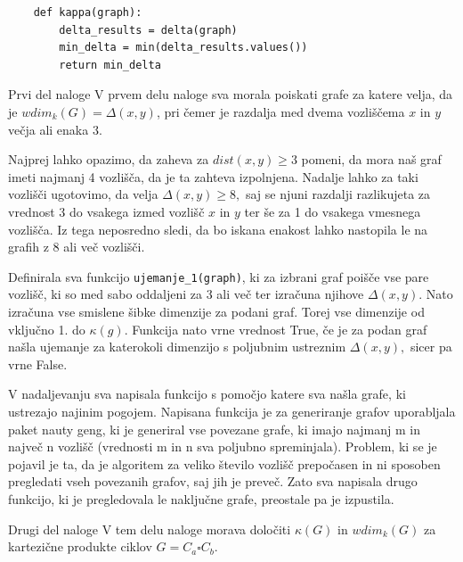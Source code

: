 \documentclass[12pt,a4paper]{amsart}
\makeatletter
\renewcommand\subsection{\@startsection{subsection}{2}%
  \z@{.5\linespacing\@plus.7\linespacing}{.5\linespacing}%
  {\normalfont\scshape}}
\theoremstyle{plain} %
\makeatother
\begin{document}
\begin{lstlisting}
    def kappa(graph):
        delta_results = delta(graph)
        min_delta = min(delta_results.values())
        return min_delta
\end{lstlisting}
\bigskip

\subsection{Prvi del naloge}
V prvem delu naloge sva morala poiskati grafe za katere velja, da je  $wdim_k(G) = \Delta(x, y)$, 
pri čemer je razdalja med dvema vozliščema $x$ in $y$ večja ali enaka 3. 
\bigskip

Najprej lahko opazimo, da zaheva za $dist(x,y) \geq 3$ pomeni, da mora naš graf imeti najmanj 4 vozlišča, da je ta zahteva izpolnjena. Nadalje lahko za taki vozlišči ugotovimo, da velja $\Delta(x,y) \geq 8,$ saj se njuni razdalji razlikujeta za vrednost 3 do vsakega izmed vozlišč $x$ in $y$ ter še za 1 do vsakega vmesnega vozlišča. Iz tega neposredno sledi, da bo iskana enakost lahko nastopila le na grafih z 8 ali več vozlišči. 

\bigskip

Definirala sva funkcijo 
\verb|ujemanje_1(graph)|, ki za izbrani graf poišče vse pare vozlišč, ki so med sabo oddaljeni za
3 ali več ter izračuna njihove $\Delta(x,y)$. Nato izračuna vse smislene šibke dimenzije za podani graf. Torej vse dimenzije od vključno 1. do $\kappa(g)$.
Funkcija nato vrne vrednost True, če je za podan graf našla ujemanje za katerokoli dimenzijo s poljubnim ustreznim $\Delta(x,y),$ sicer pa vrne False.

V nadaljevanju sva napisala funkcijo s pomočjo katere sva našla grafe, ki ustrezajo najinim pogojem. 
Napisana funkcija je za generiranje grafov uporabljala paket nauty geng, ki je  generiral vse povezane grafe, ki imajo najmanj m in največ n 
vozlišč (vrednosti m in n sva poljubno spreminjala). Problem, ki se je pojavil je ta, da je algoritem za veliko
število vozlišč prepočasen in ni sposoben pregledati vseh povezanih grafov, saj jih je preveč. Zato sva napisala 
drugo funkcijo, ki je pregledovala le naključne grafe, preostale pa je izpustila. 
\bigskip

\subsection{Drugi del naloge}
V tem delu naloge morava določiti $\kappa(G)$ in $wdim_k(G)$ za kartezične produkte ciklov $G = C_a \square C_b$.
\end{document}
